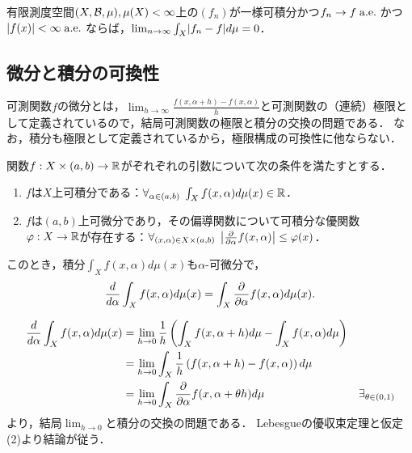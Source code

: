 \documentclass[uplatex, dvipdfmx]{jsreport}
\begin{document}
\begin{theorem}[Vitali]
    有限測度空間$(X,\mathcal{B},\mu),\mu(X)<\infty$上の$(f_n)$が一様可積分かつ$f_n\to f\;\mathrm{a.e.}\;$かつ$\lvert f(x)\rvert<\infty\;\mathrm{a.e.}\;$ならば，$\lim_{n\to\infty}\int_X\lvert f_n-f\rvert d\mu=0$．
\end{theorem}

\subsection{微分と積分の可換性}

\begin{tcolorbox}[colframe=ForestGreen, colback=ForestGreen!10!white,breakable,colbacktitle=ForestGreen!40!white,coltitle=black,fonttitle=\bfseries\sffamily,
title=]
    可測関数$f$の微分とは，$\lim_{h\to\infty}\frac{f(x,\alpha+h)-f(x,\alpha)}{h}$と可測関数の（連続）極限として定義されているので，結局可測関数の極限と積分の交換の問題である．
    なお，積分も極限として定義されているから，極限構成の可換性に他ならない．
\end{tcolorbox}

\begin{theorem}
    関数$f:X\times(a,b)\to\mathbb{R}$がぞれぞれの引数について次の条件を満たすとする．
    \begin{enumerate}
        \item $f$は$X$上可積分である：$\forall_{\alpha\in(a,b)}\;\int_Xf(x,\alpha)d\mu(x)\in\mathbb{R}$．
        \item $f$は$(a,b)$上可微分であり，その偏導関数について可積分な優関数$\varphi:X\to\mathbb{R}$が存在する：$\forall_{(x,\alpha)\in X\times(a,b)}\;\left|\frac{\partial }{\partial \alpha}f(x,\alpha)\right|\le \varphi(x)$．
    \end{enumerate}
    このとき，積分$\int_Xf(x,\alpha)d\mu(x)$も$\alpha$-可微分で，
    \[\frac{d }{d \alpha}\int_Xf(x,\alpha)d\mu(x)=\int_X\frac{\partial }{\partial \alpha}f(x,\alpha)d\mu(x).\]
\end{theorem}
\begin{Proof}
    \begin{align*}
        \frac{d }{d \alpha}\int_Xf(x,\alpha)d\mu(x)&=\lim_{h\to0}\frac{1}{h}\left(\int_Xf(x,\alpha+h)d\mu-\int_Xf(x,\alpha)d\mu\right)\\
        &=\lim_{h\to0}\int_X\frac{1}{h}\left(f(x,\alpha+h)-f(x,\alpha)\right)d\mu\\
        &=\lim_{h\to0}\int_X\frac{\partial }{\partial \alpha}f(x,\alpha+\theta h)d\mu&\exists_{\theta\in(0,1)}
    \end{align*}
    より，結局$\lim_{h\to0}$と積分の交換の問題である．
    Lebesgueの優収束定理と仮定(2)より結論が従う．
\end{Proof}
\end{document}
